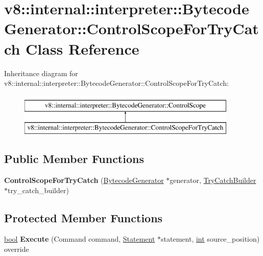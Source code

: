 \hypertarget{classv8_1_1internal_1_1interpreter_1_1BytecodeGenerator_1_1ControlScopeForTryCatch}{}\section{v8\+:\+:internal\+:\+:interpreter\+:\+:Bytecode\+Generator\+:\+:Control\+Scope\+For\+Try\+Catch Class Reference}
\label{classv8_1_1internal_1_1interpreter_1_1BytecodeGenerator_1_1ControlScopeForTryCatch}
Inheritance diagram for v8\+:\+:internal\+:\+:interpreter\+:\+:Bytecode\+Generator\+:\+:Control\+Scope\+For\+Try\+Catch\+:\begin{figure}[H]
\begin{center}
\leavevmode
\includegraphics[height=2.000000cm]{classv8_1_1internal_1_1interpreter_1_1BytecodeGenerator_1_1ControlScopeForTryCatch}
\end{center}
\end{figure}
\subsection*{Public Member Functions}
\begin{DoxyCompactItemize}
\item 
\mbox{\label{classv8_1_1internal_1_1interpreter_1_1BytecodeGenerator_1_1ControlScopeForTryCatch_a55f86d5cd0c6b4be2abbdf58fac2a5e3}} 
{\bfseries Control\+Scope\+For\+Try\+Catch} (\mbox{\hyperlink{classv8_1_1internal_1_1interpreter_1_1BytecodeGenerator}{Bytecode\+Generator}} $\ast$generator, \mbox{\hyperlink{classv8_1_1internal_1_1interpreter_1_1TryCatchBuilder}{Try\+Catch\+Builder}} $\ast$try\+\_\+catch\+\_\+builder)
\end{DoxyCompactItemize}
\subsection*{Protected Member Functions}
\begin{DoxyCompactItemize}
\item 
\mbox{\label{classv8_1_1internal_1_1interpreter_1_1BytecodeGenerator_1_1ControlScopeForTryCatch_aea2a2d2432e9aff91c336f6ec7a2cce0}} 
\mbox{\hyperlink{classbool}{bool}} {\bfseries Execute} (Command command, \mbox{\hyperlink{classv8_1_1internal_1_1Statement}{Statement}} $\ast$statement, \mbox{\hyperlink{classint}{int}} source\+\_\+position) override
\end{DoxyCompactItemize}
